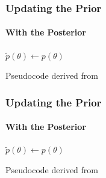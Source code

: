 \documentclass[9pt]{beamer}
\begin{document}
\begin{frame}
\frametitle{Updating the Prior}
\framesubtitle{With the Posterior}
\begin{algorithm}[H]
	$\tilde{p}(\theta) \leftarrow p(\theta)$\\
\end{algorithm}
\vspace{35pt}
\tiny Pseudocode derived from \cite{papamakarios2016fast}
\end{frame} 
\begin{frame}
\frametitle{Updating the Prior}
\framesubtitle{With the Posterior}
\begin{algorithm}[H]
	$\tilde{p}(\theta) \leftarrow p(\theta)$\\
\end{algorithm}
\vspace{35pt}
\tiny Pseudocode derived from \cite{papamakarios2016fast}
\end{frame} 
\end{document}
